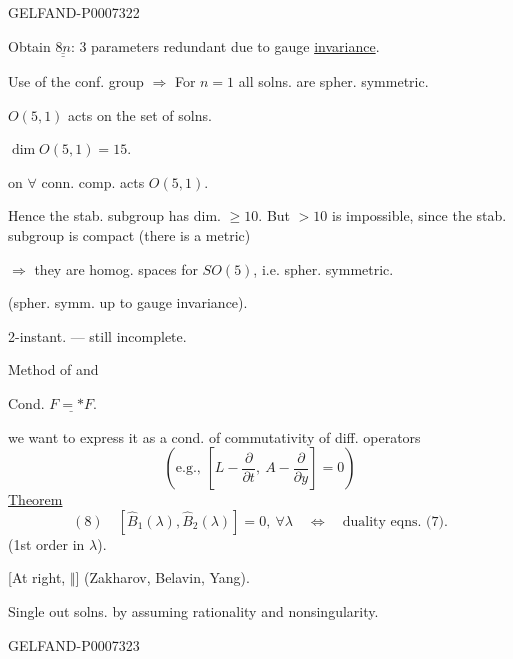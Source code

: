 \begin{GelfandAdjacentEvidence}{GELFAND-P000732}{2}


Obtain \(\underline{\underline{8n}}\): 3 parameters redundant due to gauge \underline{invariance}.

Use of the conf. group \(\Rightarrow\) For \(n=1\) all solns. are spher. symmetric.

\(O(5,1)\) acts on the set of solns.

\qquad [At right:] \(\dim O(5,1)=15\).

on \(\forall\) conn. comp. acts \(O(5,1)\).

Hence the stab. subgroup has dim. \(\geq10\). But \(>10\) is impossible, since the stab. subgroup is compact (there is a metric)

\(\Rightarrow\) they are homog. spaces for \(SO(5)\), i.e. spher. symmetric.

(spher. symm. up to gauge invariance).

2-instant. --- still incomplete.

Method of  and 

Cond. \(\underline{F={*}F}\).

we want to express it as a cond. of commutativity of diff. operators
\[
\left(\text{e.g., }\left[L-\frac{\partial}{\partial t},\
 A-\frac{\partial}{\partial y}\right]=0\right)
\]
\underline{Theorem}
\[
(8)\quad [\widehat B_1(\lambda),\widehat B_2(\lambda)]=0,\ \forall\lambda
\quad\Longleftrightarrow\quad\text{duality eqns. (7)}.
\]
(1st order in \(\lambda\)).

[At right, \(\Vert\)] (Zakharov, Belavin, Yang).

Single out solns. by assuming rationality and nonsingularity.
\end{GelfandAdjacentEvidence}
\begin{GelfandAdjacentEvidence}{GELFAND-P000732}{3}

\end{GelfandAdjacentEvidence}
